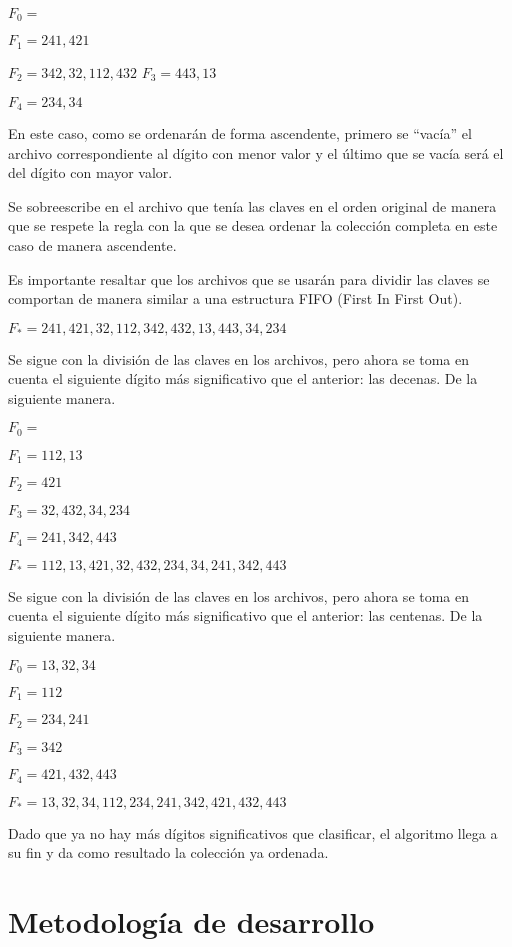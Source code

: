 \documentclass[letterpaper,12pt]{extarticle}
\begin{document}
\noindent$F_{0}  = {  } $

$F_{1} = { 241, 421 }$

$F_{2} = {  342, 32, 112, 432  }$
$F_{3} = { 443, 13 }$

$F_{4} = { 234, 34 }$

En este caso, como se ordenarán de forma ascendente, primero se “vacía” el archivo correspondiente al dígito con menor valor y el último que se vacía será el del dígito con mayor valor.

Se sobreescribe en el archivo que tenía las claves en el orden original de manera que se respete la regla  con la que se desea ordenar la colección completa en este caso de manera ascendente.

Es importante resaltar que los archivos que se usarán para dividir las claves se comportan de manera similar a una estructura FIFO (First In First Out).

$F_{*} = { 241, 421, 32, 112, 342, 432, 13, 443, 34, 234 }$

Se sigue con la división de las claves en los archivos, pero ahora se toma en cuenta el siguiente dígito más significativo que el anterior: las decenas. De la siguiente manera.

$F_{0} = {  }$

$F_{1} = { 112, 13 }$

$F_{2} = { 421 }$

$F_{3} = { 32, 432, 34, 234 }$

$F_{4} = { 241, 342, 443 }$

$F_{*} = { 112,13,421,32,432,234,34,241,342,443 }$

Se sigue con la división de las claves en los archivos, pero ahora se toma en cuenta el siguiente dígito más significativo que el anterior: las centenas. De la siguiente manera.

$F_{0} = { 13,32,34 }$

$F_{1} = { 112 }$

$F_{2} = { 234,241 }$

$F_{3} = { 342 }$

$F_{4} = { 421, 432,443 }$

$F_{*} = { 13,32,34,112,234,241,342,421,432,443 }$

Dado que ya no hay más dígitos significativos que clasificar, el algoritmo llega a su fin y da como resultado la colección ya ordenada.

\pagebreak

\section{Metodología de desarrollo}
\end{document}
